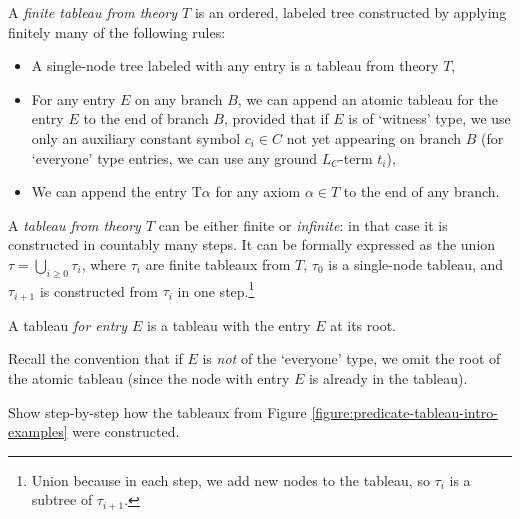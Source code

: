 \begin{definition}[Tableau]
    A \emph{finite tableau from theory $T$} is an ordered, labeled tree constructed by applying finitely many of the following rules:
    \begin{itemize}
        \item A single-node tree labeled with any entry is a tableau from theory $T$,
        \item For any entry $E$ on any branch $B$, we can append an atomic tableau for the entry $E$ to the end of branch $B$, provided that if $E$ is of `witness' type, we use only an auxiliary constant symbol $c_i\in C$ not yet appearing on branch $B$ (for `everyone' type entries, we can use any ground $L_C$-term $t_i$),
        \item We can append the entry $\mathrm{T}\alpha$ for any axiom $\alpha\in T$ to the end of any branch.
    \end{itemize}
    A \emph{tableau from theory $T$} can be either finite or \emph{infinite}: in that case it is constructed in countably many steps. It can be formally expressed as the union $\tau=\bigcup_{i\geq 0}\tau_i$, where $\tau_i$ are finite tableaux from $T$, $\tau_0$ is a single-node tableau, and $\tau_{i+1}$ is constructed from $\tau_i$ in one step.\footnote{Union because in each step, we add new nodes to the tableau, so $\tau_i$ is a subtree of $\tau_{i+1}$.}
    
    A tableau \emph{for entry $E$} is a tableau with the entry $E$ at its root.
\end{definition}
    
Recall the convention that if $E$ is \emph{not} of the `everyone' type, we omit the root of the atomic tableau (since the node with entry $E$ is already in the tableau).

\begin{exercise}
    Show step-by-step how the tableaux from Figure \ref{figure:predicate-tableau-intro-examples} were constructed.
\end{exercise}


